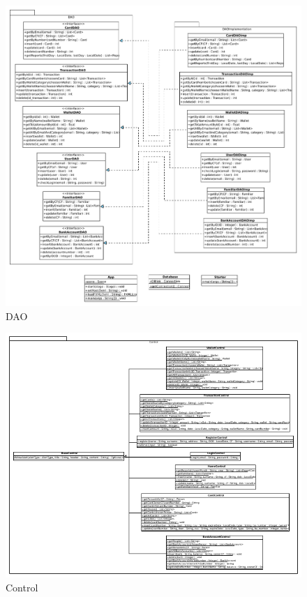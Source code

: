 \begin{figure}[!h]
    \centering
    \includegraphics[scale=0.9]{pdfs/DAO.pdf}
    \caption{DAO}\label{DAO}
\end{figure}

\begin{figure}[!h]
    \centering
    \includegraphics[scale=1.5]{pdfs/Control.pdf}
    \caption{Control}\label{Control}
\end{figure}